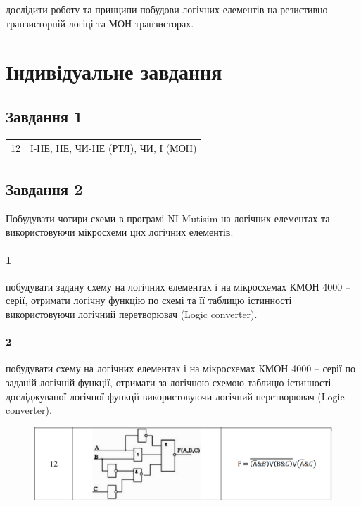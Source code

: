 \documentclass[a4paper, 12pt, oneside]{extarticle}
\begin{document}
\Margins



дослідити роботу та принципи побудови логічних елементів
на резистивно-транзисторній логіці та МОН-транзисторах.

\section*{Індивідуальне завдання}

\subsection*{Завдання 1}

\begin{tabular}{c||c}
	12 & І-НЕ, НЕ, ЧИ-НЕ (РТЛ), ЧИ, І (МОН)
\end{tabular}

\subsection*{Завдання 2}

Побудувати чотири схеми в програмі NI Mutisim на логічних елементах та
використовуючи мікросхеми цих логічних елементів.
\paragraph{1} побудувати задану схему на логічних елементах і на
мікросхемах КМОН 4000 – серії, отримати логічну функцію по схемі та її
таблицю істинності використовуючи логічний перетворювач (Logic converter).
\paragraph{2} побудувати схему на логічних елементах і на мікросхемах
КМОН 4000 – серії по заданій логічній функції, отримати за логічною схемою
таблицю істинності досліджуваної логічної функції використовуючи логічний
перетворювач (Logic converter).

\begin{figure}[h]
	\includegraphics[width=\textwidth]{task_2}
\end{figure}
\end{document}
